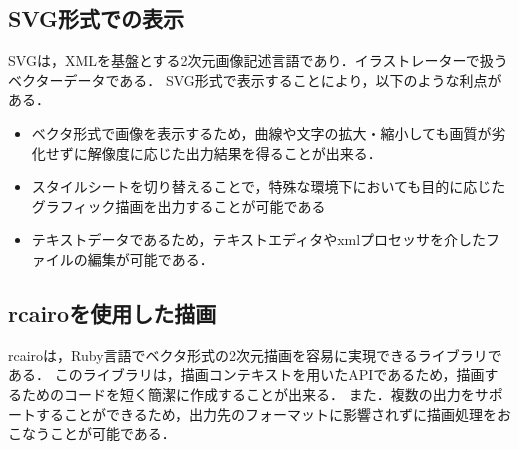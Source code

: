 \subsection{SVG形式での表示}
SVGは，XMLを基盤とする2次元画像記述言語であり．イラストレーターで扱うベクターデータである\cite{svg}．
SVG形式で表示することにより，以下のような利点がある．

\begin{itemize}
\item ベクタ形式で画像を表示するため，曲線や文字の拡大・縮小しても画質が劣化せずに解像度に応じた出力結果を得ることが出来る．
\item スタイルシートを切り替えることで，特殊な環境下においても目的に応じたグラフィック描画を出力することが可能である
\item テキストデータであるため，テキストエディタやxmlプロセッサを介したファイルの編集が可能である．
\end{itemize}
\subsection{rcairoを使用した描画}
rcairoは，Ruby言語でベクタ形式の2次元描画を容易に実現できるライブラリである．
このライブラリは，描画コンテキストを用いたAPIであるため，描画するためのコードを短く簡潔に作成することが出来る．
また．複数の出力をサポートすることができるため，出力先のフォーマットに影響されずに描画処理をおこなうことが可能である\cite{cairo}．

